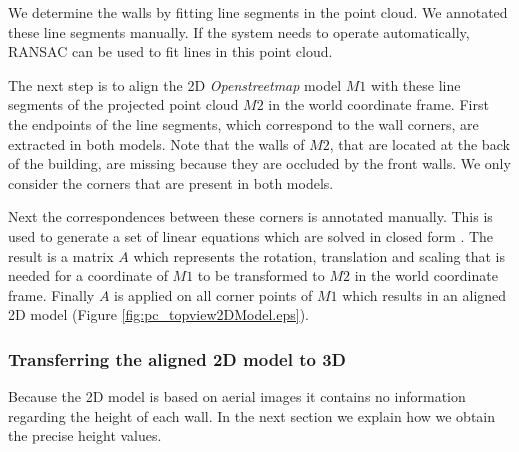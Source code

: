 We determine the walls by fitting line segments in the point cloud.  We
annotated these line segments manually.  If the system needs to operate
automatically, RANSAC can be used to fit lines in this point cloud.

\clearpage

The next step is to align the 2D \emph{Openstreetmap\cite{Openstreetmap}} model $M1$ with these line segments of the
projected point cloud $M2$ in the world coordinate frame.  First the endpoints of the line segments, which
correspond to the wall corners, are extracted in both models.
Note that the walls of $M2$, that are located at the back of the building, are missing
because they are occluded by the front walls. We only consider the corners that
are present in both models.

Next the correspondences between these corners is annotated manually. 
This is used to generate a set of linear equations
which are solved in closed form \cite{hartley}. The result is a matrix $A$
which represents the rotation, translation and scaling that is needed for a
coordinate of $M1$ to be transformed to $M2$ in the world coordinate frame.
Finally $A$ is applied on all corner points of $M1$ which results in an aligned 2D
model (Figure \ref{fig:pc_topview2DModel.eps}).








\subsubsection{Transferring the aligned 2D model to 3D}
Because the 2D model is based on aerial images it contains no
information regarding the height of each wall. 
In the next section we explain how we obtain the precise height values.\\

